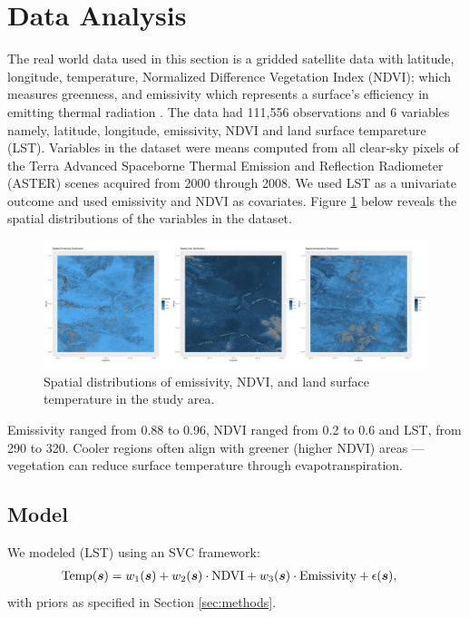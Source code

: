 
\section{Data Analysis}
\label{sec:data analysis}
The real world data used in this section is a gridded satellite data with latitude, longitude, temperature, Normalized Difference Vegetation Index (NDVI); which measures greenness, and emissivity which represents a surface's efficiency in emitting thermal radiation \citep{hulley_new_2008, hulley_aster_2008, hulley_north_2009, hulley_validation_2009, hulley_generating_2011, hulley_quantifying_2012, nasa_jpl_aster_2014, hulley_span_2015}.
The data had 111,556 observations and 6 variables namely, latitude, longitude, emissivity, NDVI and land surface tempareture (LST). Variables in the dataset were means computed from all clear-sky pixels of the Terra Advanced Spaceborne Thermal Emission and Reflection Radiometer (ASTER) scenes acquired from 2000 through 2008.
We used LST as a univariate outcome and used emissivity and NDVI as covariates.
Figure \ref{fig:spatialpatterns} below reveals the spatial  distributions of the variables in the dataset.

 \begin{figure}[H]
 \centering
 \includegraphics[width=\textwidth]{../../figures/spatial_horizontal_stack.png}
 \caption{
   Spatial distributions of emissivity, NDVI, and  land surface temperature in the study area. 
 }
 \label{fig:spatialpatterns}
 \end{figure}
 
  Emissivity ranged from 0.88 to 0.96, NDVI ranged from 0.2 to 0.6  and LST, from 290 to 320.  
 Cooler regions often align with greener (higher NDVI) areas — vegetation can reduce surface temperature through evapotranspiration.
\subsection{Model}
We modeled (LST) using an SVC framework:
\begin{align*}
\text{Temp}(\boldsymbol{s}) &= w_1(\boldsymbol{s}) + w_2(\boldsymbol{s})\cdot\text{NDVI} + w_3(\boldsymbol{s})\cdot\text{Emissivity} + \epsilon(\boldsymbol{s}),
\end{align*}
with priors as specified in Section \ref{sec:methods}.

